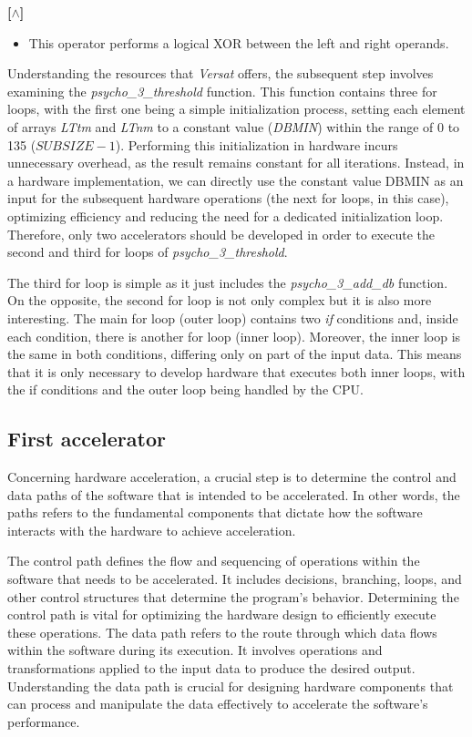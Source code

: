 \documentclass{article}
\begin{document}
\textbf{[$\wedge$]}
\begin{itemize}
\item This operator performs a logical XOR between the left and right operands.
\end{itemize}

\vspace{0.5cm}

Understanding the resources that \textit{Versat} offers, the subsequent step involves examining the \textit{psycho\_3\_threshold} function.
This function contains three for loops, with the first one being a simple initialization process, setting each element of arrays \textit{LTtm} and \textit{LTnm} to a constant value (\textit{DBMIN}) within the range of 0 to 135 ($SUBSIZE-1$). Performing this initialization in hardware incurs unnecessary overhead, as the result remains constant for all iterations. Instead, in a hardware implementation, we can directly use the constant value DBMIN as an input for the subsequent hardware operations (the next for loops, in this case), optimizing efficiency and reducing the need for a dedicated initialization loop.
Therefore, only two accelerators should be developed in order to execute the second and third for loops of \textit{psycho\_3\_threshold}.

The third for loop is simple as it just includes the \textit{psycho\_3\_add\_db} function. 
On the opposite, the second for loop is not only complex but it is also more interesting. The main for loop (outer loop) contains two \textit{if} conditions and, inside each condition, there is another for loop (inner loop). Moreover, the inner loop is the same in both conditions, differing only on part of the input data. This means that it is only necessary to develop hardware that executes both inner loops, with the if conditions and the outer loop being handled by the CPU.

\subsection{First accelerator}
Concerning hardware acceleration, a crucial step is to determine the control and data paths of the software that is intended to be accelerated. In other words, the paths refers to the fundamental components that dictate how the software interacts with the hardware to achieve acceleration.

The control path defines the flow and sequencing of operations within the software that needs to be accelerated. It includes decisions, branching, loops, and other control structures that determine the program's behavior. Determining the control path is vital for optimizing the hardware design to efficiently execute these operations.
The data path refers to the route through which data flows within the software during its execution. It involves operations and transformations applied to the input data to produce the desired output. Understanding the data path is crucial for designing hardware components that can process and manipulate the data effectively to accelerate the software's performance.
\end{document}
